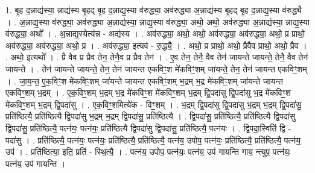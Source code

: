 \documentclass[17pt]{extarticle}
\begin{document}
1. बृ॒ह द॒न्नाद्य॑स्या॒ न्नाद्य॑स्य बृ॒हद् बृ॒ह द॒न्नाद्य॒स्या व॑रुद्ध्या॒ अव॑रुद्ध्या अ॒न्नाद्य॑स्य बृ॒हद् बृ॒ह द॒न्नाद्य॒स्या व॑रुद्ध्यै । . अ॒न्नाद्य॒स्या व॑रुद्ध्या॒ अव॑रुद्ध्या अ॒न्नाद्य॑स्या॒ न्नाद्य॒स्या व॑रुद्ध्या॒ अथो॒ अथो॒ अव॑रुद्ध्या 
अ॒न्नाद्य॑स्या॒ न्नाद्य॒स्या व॑रुद्ध्या॒ अथो᳚ । . अ॒न्नाद्य॒स्येत्य॑न्न - अद्य॑स्य । . अव॑रुद्ध्या॒ अथो॒ अथो॒ अव॑रुद्ध्या॒ अव॑रुद्ध्या॒ अथो॒ प्र प्राथो॒ अव॑रुद्ध्या॒ अव॑रुद्ध्या॒ अथो॒ प्र । . अव॑रुद्ध्या॒ इत्यव॑ - रु॒द्ध्यै॒ । . अथो॒ प्र प्राथो॒ अथो॒ प्रैवैव प्राथो॒ अथो॒ प्रैव । . अथो॒ इत्यथो᳚ । . प्रै वैव प्र प्रैव तेन॒ तेनै॒व प्र प्रैव तेन॑ । . ए॒व तेन॒ तेनै॒ वैव तेन॑ जायन्ते जायन्ते॒ तेनै॒ वैव तेन॑ जायन्ते । . तेन॑ जायन्ते जायन्ते॒ तेन॒ तेन॑ जायन्त एकविꣳ॒॒श मे॑कविꣳ॒॒शम् जा॑यन्ते॒ तेन॒ तेन॑ जायन्त एकविꣳ॒॒शम् । . जा॒य॒न्त॒ ए॒क॒विꣳ॒॒श मे॑कविꣳ॒॒शम् जा॑यन्ते जायन्त एकविꣳ॒॒शम् भ॒द्रम् भ॒द्र मे॑कविꣳ॒॒शम् जा॑यन्ते जायन्त एकविꣳ॒॒शम् भ॒द्रम् । . ए॒क॒विꣳ॒॒शम् भ॒द्रम् भ॒द्र मे॑कविꣳ॒॒श मे॑कविꣳ॒॒शम् भ॒द्रम् द्वि॒पदा॑सु द्वि॒पदा॑सु भ॒द्र मे॑कविꣳ॒॒श मे॑कविꣳ॒॒शम् भ॒द्रम् द्वि॒पदा॑सु । . ए॒क॒विꣳ॒॒शमित्ये॑क - विꣳ॒॒शम् । . भ॒द्रम् द्वि॒पदा॑सु द्वि॒पदा॑सु भ॒द्रम् भ॒द्रम् द्वि॒पदा॑सु॒ प्रति॑ष्ठित्यै॒ प्रति॑ष्ठित्यै द्वि॒पदा॑सु भ॒द्रम् भ॒द्रम् द्वि॒पदा॑सु॒ प्रति॑ष्ठित्यै । . द्वि॒पदा॑सु॒ प्रति॑ष्ठित्यै॒ प्रति॑ष्ठित्यै द्वि॒पदा॑सु द्वि॒पदा॑सु॒ प्रति॑ष्ठित्यै॒ पत्न॑यः॒ पत्न॑यः॒ प्रति॑ष्ठित्यै द्वि॒पदा॑सु द्वि॒पदा॑सु॒ प्रति॑ष्ठित्यै॒ पत्न॑यः । . द्वि॒पदा॒स्विति॑ द्वि - पदा॑सु । . प्रति॑ष्ठित्यै॒ पत्न॑यः॒ पत्न॑यः॒ प्रति॑ष्ठित्यै॒ प्रति॑ष्ठित्यै॒ पत्न॑य॒ उपोप॒ पत्न॑यः॒ प्रति॑ष्ठित्यै॒ प्रति॑ष्ठित्यै॒ पत्न॑य॒ उप॑ । . प्रति॑ष्ठित्या॒ इति॒ प्रति॑ - स्थि॒त्यै॒ । . पत्न॑य॒ उपोप॒ पत्न॑यः॒ पत्न॑य॒ उप॑ गायन्ति गाय॒ न्त्युप॒ पत्न॑यः॒ पत्न॑य॒ उप॑ गायन्ति । \newline
\end{document}
